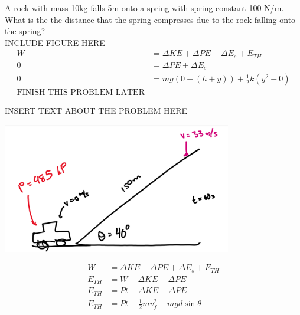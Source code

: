 \begin{problem}
    A rock with mass 10kg falls 5m onto a spring with spring constant 100 N/m. What is the the distance that the spring compresses due to the rock falling onto the spring?\\
    
    INCLUDE FIGURE HERE\\

    $$
    \begin{aligned}
        W &= \Delta KE + \Delta PE + \Delta E_s + E_{TH}\\
        0 &= \Delta PE + \Delta E_s\\
        0 &= mg(0-(h+y))+\frac{1}{2}k(y^2-0)\\
        \text{FINISH THIS PROBLEM LATER}
    \end{aligned}
    $$
\end{problem}


\begin{problem}
    INSERT TEXT ABOUT THE PROBLEM HERE

    \begin{center}
        \includegraphics[width=0.75\textwidth]{chapters/ch4/images/fig4_13.PNG}
    \end{center}

    $$
    \begin{aligned}
        W &= \Delta KE + \Delta PE +\Delta E_s + E_{TH}\\
        E_{TH} &= W - \Delta KE - \Delta PE\\
        E_{TH} &= Pt - \Delta KE - \Delta PE\\
        E_{TH} &= Pt - \frac{1}{2}mv_f^2 - mgd\sin\theta
    \end{aligned}
    $$
\end{problem}
